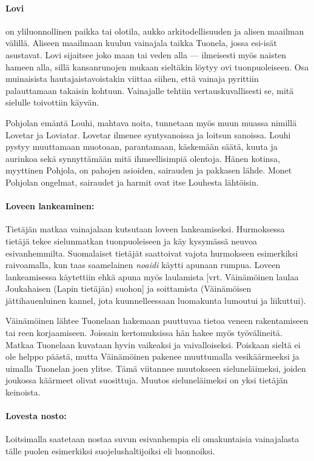   \paragraph{Lovi} on yliluonnollinen paikka tai olotila, aukko arkitodellisuuden ja alisen
    maailman välillä. Aliseen maailmaan kuuluu vainajala taikka Tuonela, jossa esi-isät asustavat.
    Lovi sijaitsee joko maan tai veden alla --- ilmeisesti myös naisten hameen alla, sillä
    kansanrunojen mukaan sieltäkin löytyy ovi tuonpuoleiseen. Osa muinaisista hautajaistavoistakin
    viittaa siihen, että vainaja pyrittiin palauttamaan takaisin kohtuun. Vainajalle tehtiin
    vertauskuvallisesti se, mitä sielulle toivottiin käyvän.
    \par
    Pohjolan emäntä Louhi, mahtava noita, tunnetaan myös muun muassa nimillä Lovetar ja Loviatar.
    Lovetar ilmenee syntysanoissa ja loitsun sanoissa. Louhi pystyy muuttamaan muotoaan,
    parantamaan, käskemään säätä, kuuta ja aurinkoa sekä synnyttämään mitä ihmeellisimpiä olentoja.
    Hänen kotinsa, myyttinen Pohjola, on pahojen asioiden, sairauden ja pakkasen lähde. Monet
    Pohjolan ongelmat, sairaudet ja harmit ovat itse Louhesta lähtöisin.
  \paragraph{Loveen lankeaminen:} Tietäjän matkaa vainajalaan kutsutaan loveen lankeamiseksi.
    Hurmoksessa tietäjä tekee sielunmatkan tuonpuolei\-seen ja käy kysymässä neuvoa esivanhemmilta.
    Suomalaiset tietäjät saattoivat vajota hurmokseen esimerkiksi raivoamalla, kun taas saamelainen
    \emph{noaidi} käytti apunaan rumpua. Loveen lankeamisessa käytettiin ehkä apuna myös laulamista
    [vrt. Väinämöinen laulaa Joukahaisen (Lapin tietäjän) suohon] ja soittamista (Väinämöisen
    jättihauenluinen kannel, jota kuunnelleessaan luomakunta lumoutui ja liikuttui).
    \par
    Väinämöinen lähtee Tuonelaan hakemaan puuttuvaa tietoa veneen rakentamiseen tai reen
    korjaamiseen. Joissain kertomuksissa hän hakee myös työvälineitä. Matkaa Tuonelaan
    kuvataan hyvin vaikeaksi ja vaivalloiseksi. Poiskaan sieltä ei ole helppo päästä, mutta
    Väinämöinen pakenee muuttumalla vesikäärmeeksi ja uimalla Tuonelan joen ylitse. Tämä
    viitannee muutokseen sieluneläimeksi, joiden joukossa käärmeet olivat suosittuja. Muutos
    sieluneläimeksi on yksi tietäjän keinoista.
  \paragraph{Lovesta nosto:} Loitsimalla saatetaan nostaa suvun esivanhempia eli omakuntaisia
    vainajalasta tälle puolen esimerkiksi suojelushaltijoiksi eli luonnoiksi.

